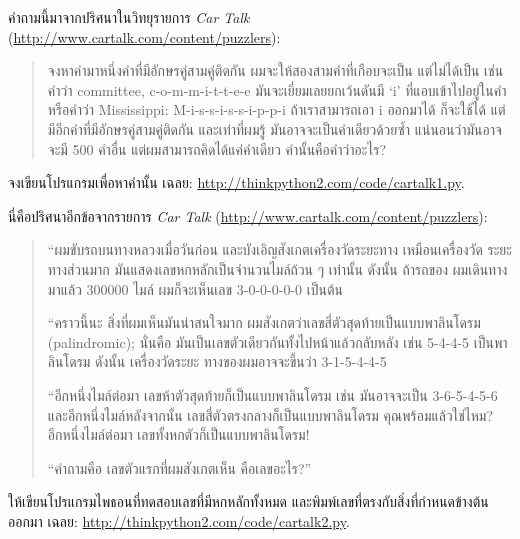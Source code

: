 \begin{exercise}

คำถามนี้มาจากปริศนาในวิทยุรายการ {\em Car Talk} (\url{http://www.cartalk.com/content/puzzlers}):

\begin{quote}
จงหาคำมาหนึ่งคำที่มีอักษรคู่สามคู่ติดกัน ผมจะให้สองสามคำที่เกือบจะเป็น แต่ไม่ได้เป็น เช่น
คำว่า committee, c-o-m-m-i-t-t-e-e มันจะเยี่ยมเลยยกเว้นดันมี `i' ที่แอบเข้าไปอยู่ในคำ
หรือคำว่า Mississippi: M-i-s-s-i-s-s-i-p-p-i ถ้าเราสามารถเอา i ออกมาได้ ก็จะใช้ได้
แต่มีอีกคำที่มีอักษรคู่สามคู่ติดกัน และเท่าที่ผมรู้ มันอาจจะเป็นคำเดียวด้วยซ้ำ แน่นอนว่ามันอาจจะมี
500 คำอื่น แต่ผมสามารถคิดได้แค่คำเดียว คำนั้นคือคำว่าอะไร?
\end{quote}

จงเขียนโปรแกรมเพื่อหาคำนั้น
เฉลย: \url{http://thinkpython2.com/code/cartalk1.py}.

\end{exercise}


\begin{exercise}
นี่คือปริศนาอีกข้อจากรายการ {\em Car Talk} (\url{http://www.cartalk.com/content/puzzlers}):

\begin{quote}
``ผมขับรถบนทางหลวงเมื่อวันก่อน และบังเอิญสังเกตเครื่องวัดระยะทาง เหมือนเครื่องวัด
ระยะทางส่วนมาก มันแสดงเลขหกหลักเป็นจำนวนไมล์ถ้วน ๆ เท่านั้น ดังนั้น ถ้ารถของ
ผมเดินทางมาแล้ว 300000 ไมล์ ผมก็จะเห็นเลข 3-0-0-0-0-0 เป็นต้น

``คราวนี้นะ สิ่งที่ผมเห็นมันน่าสนใจมาก ผมสังเกตว่าเลขสี่ตัวสุดท้ายเป็นแบบพาลินโดรม (palindromic);
นั่นคือ มันเป็นเลขตัวเดียวกันทั้งไปหน้าแล้วกลับหลัง เช่น 5-4-4-5 เป็นพาลินโดรม ดังนั้น เครื่องวัดระยะ
ทางของผมอาจจะขึ้นว่า 3-1-5-4-4-5

``อีกหนึ่งไมล์ต่อมา เลขห้าตัวสุดท้ายก็เป็นแบบพาลินโดรม เช่น มันอาจจะเป็น 3-6-5-4-5-6
และอีกหนึ่งไมล์หลังจากนั้น เลขสี่ตัวตรงกลางก็เป็นแบบพาลินโดรม 
คุณพร้อมแล้วใช่ไหม?
อีกหนึ่งไมล์ต่อมา เลขทั้งหกตัวก็เป็นแบบพาลินโดรม! 

``คำถามคือ เลขตัวแรกที่ผมสังเกตเห็น คือเลขอะไร?''
\end{quote}

ให้เขียนโปรแกรมไพธอนที่ทดสอบเลขที่มีหกหลักทั้งหมด และพิมพ์เลขที่ตรงกับสิ่งที่กำหนดข้างต้น
ออกมา
เฉลย: \url{http://thinkpython2.com/code/cartalk2.py}.

\end{exercise}


